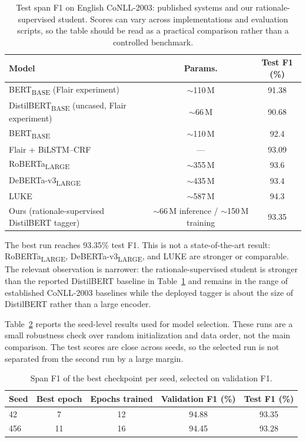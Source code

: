 \documentclass[a4paper,12pt]{extarticle}
\begin{document}
\begin{table}[H]
\centering
\small
\setlength{\tabcolsep}{4pt}
\caption{Test span F1 on English CoNLL-2003: published systems and our rationale-supervised student. Scores can vary across implementations and evaluation scripts, so the table should be read as a practical comparison rather than a controlled benchmark.}
\label{tab:sota}
\begin{tabularx}{\linewidth}{@{}Xcc@{}}
\toprule
\textbf{Model} & \textbf{Params.} & \textbf{Test F1 (\%)} \\
\midrule
BERT\textsubscript{BASE} (Flair experiment)~\cite{schweter2019flairconll} & $\sim$110\,M & 91.38 \\
DistilBERT\textsubscript{BASE} (uncased, Flair experiment)~\cite{schweter2019flairconll} & $\sim$66\,M & 90.68 \\
BERT\textsubscript{BASE}~\cite{devlin2018bert} & $\sim$110\,M & 92.4 \\
Flair + BiLSTM--CRF~\cite{akbik2018contextual} & --- & 93.09 \\
RoBERTa\textsubscript{LARGE}~\cite{liu2019roberta} & $\sim$355\,M & 93.6 \\
DeBERTa-v3\textsubscript{LARGE}~\cite{he2021debertav3} & $\sim$435\,M & 93.4 \\
LUKE~\cite{yamada2020luke} & $\sim$587\,M & 94.3 \\
\midrule
Ours (rationale-supervised DistilBERT tagger) & $\sim$66\,M inference / $\sim$150\,M training & 93.35 \\
\bottomrule
\end{tabularx}
\end{table}

The best run reaches 93.35\% test F1. This is not a state-of-the-art result: RoBERTa\textsubscript{LARGE}, DeBERTa-v3\textsubscript{LARGE}, and LUKE are stronger or comparable. The relevant observation is narrower: the rationale-supervised student is stronger than the reported DistilBERT baseline in Table~\ref{tab:sota} and remains in the range of established CoNLL-2003 baselines while the deployed tagger is about the size of DistilBERT rather than a large encoder.

Table~\ref{tab:seed-results} reports the seed-level results used for model selection. These runs are a small robustness check over random initialization and data order, not the main comparison. The test scores are close across seeds, so the selected run is not separated from the second run by a large margin.

\begin{table}[H]
\centering
\small
\caption{Span F1 of the best checkpoint per seed, selected on validation F1.}
\label{tab:seed-results}
\begin{tabularx}{0.95\linewidth}{@{}lcccc@{}}
\toprule
\textbf{Seed} & \textbf{Best epoch} & \textbf{Epochs trained} & \textbf{Validation F1 (\%)} & \textbf{Test F1 (\%)} \\
\midrule
42 & 7 & 12 & 94.88 & 93.35 \\
456 & 11 & 16 & 94.45 & 93.28 \\
\bottomrule
\end{tabularx}
\end{table}
\end{document}
